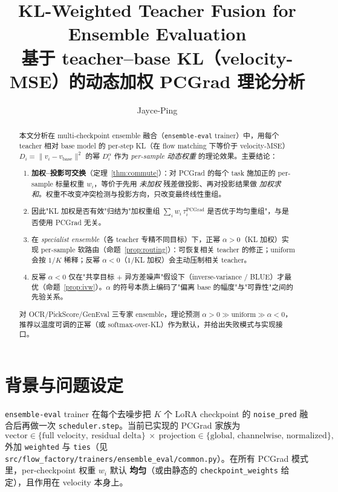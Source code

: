 \documentclass[11pt,a4paper]{article}
\title{\textbf{KL-Weighted Teacher Fusion for Ensemble Evaluation}\\[0.3em]
\large 基于 teacher--base KL（velocity-MSE）的动态加权 PCGrad 理论分析}
\author{Jayce-Ping}
\date{}
\newcommand{\PC}{\mathrm{PCGrad}}
\newcommand{\vb}{v_{\mathrm{base}}}
\newcommand{\norm}[1]{\lVert #1\rVert}
\theoremstyle{plain}
\theoremstyle{definition}
\begin{document}
\maketitle

\begin{abstract}
本文分析在 multi-checkpoint ensemble 融合（\texttt{ensemble-eval} trainer）中，用每个 teacher 相对 base model 的 per-step KL（在 flow matching 下等价于 velocity-MSE）$D_i=\norm{v_i-\vb}^2$ 的幂 $D_i^\alpha$ 作为 \emph{per-sample 动态权重} 的理论效果。主要结论：
\begin{enumerate}[leftmargin=1.6em]
\item \textbf{加权--投影可交换}（定理~\ref{thm:commute}）：对 PCGrad 的每个 task 施加正的 per-sample 标量权重 $w_i$，等价于先用 \emph{未加权} 残差做投影、再对投影结果做 \emph{加权求和}。权重不改变冲突检测与投影方向，只改变最终线性重组。
\item 因此"KL 加权是否有效"归结为"加权重组 $\sum_i w_i\,\tau_i^{\PC}$ 是否优于均匀重组"，与是否使用 PCGrad 无关。
\item 在 \emph{specialist ensemble}（各 teacher 专精不同目标）下，正幂 $\alpha>0$（KL 加权）实现 per-sample 软路由（命题~\ref{prop:routing}）：可恢复相关 teacher 的修正；uniform 会按 $1/K$ 稀释；反幂 $\alpha<0$（$1/$KL 加权）会主动压制相关 teacher。
\item 反幂 $\alpha<0$ 仅在"共享目标 $+$ 异方差噪声"假设下（inverse-variance / BLUE）才最优（命题~\ref{prop:ivw}）。$\alpha$ 的符号本质上编码了"偏离 base 的幅度"与"可靠性"之间的先验关系。
\end{enumerate}
对 OCR/PickScore/GenEval 三专家 ensemble，理论预测 $\alpha>0 \gg \text{uniform} \gg \alpha<0$，推荐以温度可调的正幂（或 softmax-over-KL）作为默认，并给出失败模式与实现接口。
\end{abstract}

\tableofcontents
\newpage

\section{背景与问题设定}

\texttt{ensemble-eval} trainer 在每个去噪步把 $K$ 个 LoRA checkpoint 的 \texttt{noise\_pred} 融合后再做一次 \texttt{scheduler.step}。当前已实现的 PCGrad 家族为
\[
\text{vector}\in\{\text{full velocity},\ \text{residual delta}\}\ \times\ \text{projection}\in\{\text{global, channelwise, normalized}\},
\]
外加 \texttt{weighted} 与 \texttt{ties}（见 \texttt{src/flow\_factory/trainers/ensemble\_eval/common.py}）。在所有 PCGrad 模式里，per-checkpoint 权重 $w_i$ 默认 \textbf{均匀}（或由静态的 \texttt{checkpoint\_weights} 给定），且作用在 velocity 本身上。
\end{document}
